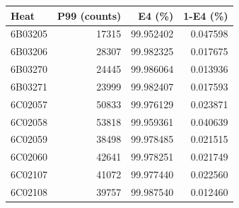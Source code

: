 \begingroup
{}
\begin{tabular}{lrrr}
\toprule
Heat & P99 (counts) & E4 (\%) & 1-E4 (\%) \\
\midrule
6B03205 & 17315 & 99.952402 & 0.047598 \\
6B03206 & 28307 & 99.982325 & 0.017675 \\
6B03270 & 24445 & 99.986064 & 0.013936 \\
6B03271 & 23999 & 99.982407 & 0.017593 \\
6C02057 & 50833 & 99.976129 & 0.023871 \\
6C02058 & 53818 & 99.959361 & 0.040639 \\
6C02059 & 38498 & 99.978485 & 0.021515 \\
6C02060 & 42641 & 99.978251 & 0.021749 \\
6C02107 & 41072 & 99.977440 & 0.022560 \\
6C02108 & 39757 & 99.987540 & 0.012460 \\
\bottomrule
\end{tabular}
\endgroup
